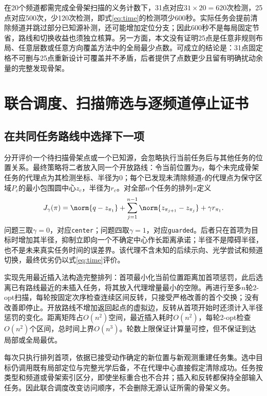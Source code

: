 在20个频道都需完成全骨架扫描的义务计数下，31点对应$31\times20=620$次检测，25点对应500次，少120次检测，即式\eqref{eq:time}的检测项少600秒。实际任务会提前清除频道并跳过部分已知源补测，还可能增加定位分支；因此600秒不是每局固定节省，路线和切换收益也须独立核算。另一方面，本文没有证明25点是任意非规则布局、任意层数或任意方向覆盖方法中的全局最少点数。可成立的结论是：31点固定格不可删与25点重新设计可覆盖并不矛盾，后者提供了点数更少且留有明确扰动余量的完整发现骨架。

\section{联合调度、扫描筛选与逐频道停止证书}
\label{new:sec-dispatch}
\subsection{在共同任务路线中选择下一项}
分开评价一个待扫描骨架点或一个已知源，会忽略执行当前任务后与其他任务的位置关系。最终策略将二者放入同一个开放路线：令当前位置为$q$，每个未完成骨架任务的代理点为其检测坐标、半径为0；每个已发现未清除频道$c$的代理点为保守区域$P_c$的最小包围圆中心$z_c$，半径为$r_c$。对全部$n$个任务的排列$\pi$定义
\begin{equation}\label{new:eq-route-proxy}
J_\gamma(\pi)=\norm{q-z_{\pi_1}}
+\sum_{j=1}^{n-1}\norm{z_{\pi_{j+1}}-z_{\pi_j}}
+\gamma r_{\pi_1}.
\end{equation}
问题三取$\gamma=0$，对应\texttt{center}；问题四取$\gamma=1$，对应\texttt{guarded}。后者只在首项为目标时增加其半径，抑制立即向一个不确定中心作长距离承诺；半径不是障碍半径，也不是未来真实任务时间的误差界。该代理不含未知的后续示向、光学尝试和频道切换，最终优劣仍以式\eqref{eq:time}评价。

实现先用最近插入法构造完整排列：首项最小化当前位置距离加首项惩罚，此后选离已有路线最近的未插入任务，将其放入代理增量最小的空隙。再进行至多$n$轮2-opt扫描，每轮按固定次序检查连续区间反转，只接受严格改善的首个交换；没有改善即停止。开放路线不增加返回起点的虚拟边，反转从首项开始时还须计入半径惩罚的变化。距离矩阵占$O(n^2)$空间，最近插入耗时$O(n^2)$，每轮2-opt检查$O(n^2)$个区间，总时间上界$O(n^3)$。轮数上限保证计算量可控，但不保证到达局部或全局最优。

每次只执行排列首项，依据已接受动作确定的新位置与新观测重建任务集。选中目标仍调用既有局部定位与完整光学后备，不在代理中心直接假定清除成功。任务按类型和频道或骨架索引区分，即使坐标重合也不合并；插入和反转都保持全部输入任务。因此联合调度改变访问顺序，不会删除无源认证所需的骨架义务。

